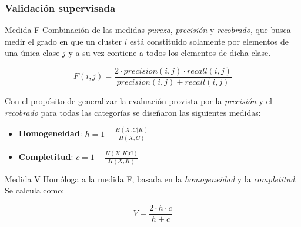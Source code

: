 \begin{frame}
    \frametitle{Validación supervisada}

    \begin{block}{Medida F}
        Combinación de las medidas \textit{pureza}, \textit{precisión} y \textit{recobrado}, que busca medir el grado en que un cluster $i$ está constituido solamente por elementos de una única clase $j$ y a su vez contiene a todos los elementos de dicha clase.
    \end{block}

    \begin{equation*}
        F(i,j) = \frac{2 \cdot precision(i,j) \cdot recall(i,j)}{precision(i,j) + recall(i,j)}
    \end{equation*}

\end{frame}

\begin{frame}

    Con el propósito de generalizar la evaluación provista por la \textit{precisión} y el \textit{recobrado} para todas las categorías se diseñaron las siguientes medidas:

    \begin{itemize}
        \item<2-> \textbf{Homogeneidad}: $h = 1 - \frac{H(X, C|K)}{H(X, C)}$
        \item<3-> \textbf{Completitud}: $c = 1 - \frac{H(X, K|C)}{H(X, K)}$
    \end{itemize}

    \pause %
    \begin{block}{Medida V}
        Homóloga a la medida F, basada en la \textit{homogeneidad} y la \textit{completitud}. Se calcula como:

        \begin{equation*}
            V = \frac{2 \cdot h \cdot c}{h + c}
        \end{equation*}
    \end{block}

\end{frame}

